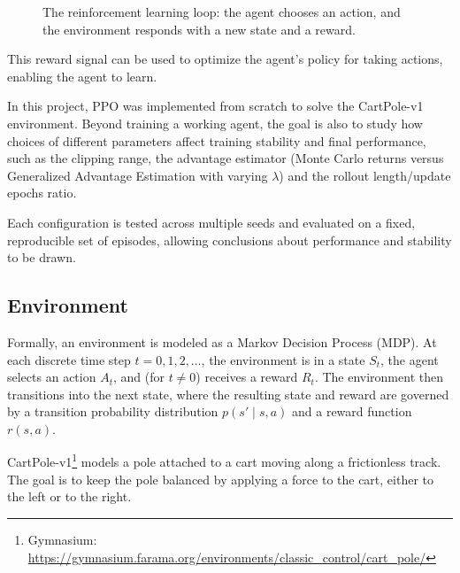 \documentclass{article}
\begin{document}
\begin{figure}[H]
  \centering
  \caption{The reinforcement learning loop: the agent chooses an action, and the environment responds with a new state and a reward.}
\end{figure}

This reward signal can be used to optimize the agent's policy for taking actions, enabling the agent to learn.

In this project, PPO was implemented from scratch to solve the CartPole-v1 environment. Beyond training a working agent, the goal is also to study how choices of different parameters affect training stability and final performance,
such as the clipping range, the advantage estimator (Monte Carlo returns versus Generalized Advantage Estimation with varying \(\lambda\)) and the rollout length/update epochs ratio.

Each configuration is tested across multiple seeds and evaluated on a fixed, reproducible set of episodes, allowing conclusions about performance and stability to be drawn.

\subsection{Environment}

Formally, an environment is modeled as a Markov Decision Process (MDP). At each discrete time step \(t = 0, 1, 2, \dots\), the environment is in a state \(S_t\), the agent selects an action \(A_t\), and (for \(t \neq 0\)) receives a reward \(R_t\). The environment then transitions into the next state, where the resulting state and reward are governed by a transition probability distribution \(p(s' \mid s, a)\) and a reward function \(r(s,a)\).

CartPole-v1\footnote{Gymnasium: \url{https://gymnasium.farama.org/environments/classic_control/cart_pole/}} models a pole attached to a cart moving along a frictionless track. The goal is to keep the pole balanced by applying a force to the cart, either to the left or to the right.
\end{document}
